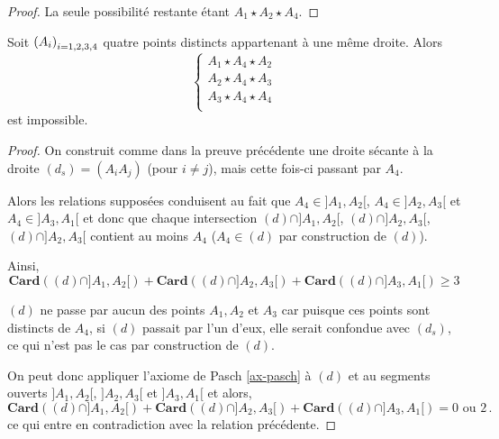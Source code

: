 \begin{cor}
\begin{proof}
        La seule possibilité restante étant $A_1 \star A_2 \star A_4$.
    \end{proof}
\end{cor}
\begin{lem}\label{lem-impossibiliteunpointentretous}
Soit $\left(A_{i}\right)_{i = 1,2,3,4}$ quatre points distincts appartenant à une même droite. Alors
    \begin{equation*}
        \left\{
            \begin{array}{c}
                 A_{1} \star A_{4} \star A_{2} \\
                 A_{2} \star A_{4} \star A_{3}\\
                 A_{3} \star A_{4} \star A_{4}\\
            \end{array}
            \right. 
    \end{equation*}
est impossible.
    \begin{proof}
        On construit comme dans la preuve précédente une droite sécante à la droite $(d_s)=(A_i A_j)$ (pour $i\neq j$), mais cette fois-ci passant par $A_4$. 
        
        Alors les relations supposées conduisent au fait que $A_4\in ]A_1,A_2[$,   $A_4\in ]A_2,A_3[$ et $A_4\in ]A_3,A_1[$ et donc que chaque intersection $(d)\cap ]A_1,A_2[$, $(d)\cap ]A_2,A_3[$, $(d)\cap ]A_2,A_3[$ contient au moins $A_4$ ($A_4\in (d)$ par construction de $(d)$).

        Ainsi,
        \begin{equation*}
           \mathbf{Card}\left((d)\cap]A_1,A_2[\right)+\mathbf{Card}\left((d)\cap]A_2,A_3[\right)+\mathbf{Card}\left((d)\cap]A_3,A_1[\right) \geq 3
        \end{equation*}

        $(d)$ ne passe par aucun des points $A_1,A_2$ et $A_3$ car puisque ces points sont distincts de $A_4$, si $(d)$ passait par l'un d'eux, elle serait confondue avec $(d_s)$, ce qui n'est pas le cas par construction de $(d)$.

        On peut donc appliquer l'axiome de Pasch \ref{ax-pasch} à $(d)$ et au segments ouverts $]A_1,A_2[$, $ ]A_2,A_3[$ et $ ]A_3,A_1[$ et alors,
        \begin{equation*}
            \mathbf{Card}\left((d)\cap]A_1,A_2[\right)+\mathbf{Card}\left((d)\cap]A_2,A_3[\right)+\mathbf{Card}\left((d)\cap]A_3,A_1[\right) = 0 \text{ ou }2\,.
        \end{equation*}
        ce qui entre en contradiction avec la relation précédente.
    \end{proof}
\end{lem}
